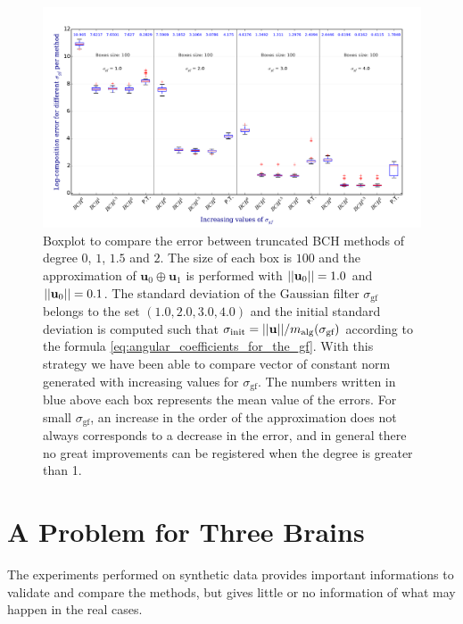 \begin{figure}[!ht]
	\hspace{-0.5cm}
	\includegraphics[scale=0.5]{figures/SVF_boxplot_comparisons_BCH.pdf}
	\caption{Boxplot to compare the error between truncated BCH methods of degree $0$, $1$, $1.5$ and $2$. The size of each box is $100$ and the approximation of $\mathbf{u}_{0}\oplus \mathbf{u}_1$ is performed with $\vert\lvert \mathbf{u}_{0} \rvert\vert = 1.0$ and $\vert\lvert \mathbf{u}_{0} \rvert\vert = 0.1$. The standard deviation of the Gaussian filter $\sigma_{\text{gf}}$ belongs to the set $(1.0, 2.0, 3.0, 4.0)$ and the initial standard deviation is computed such that $\sigma_{\text{init}} = \vert\lvert \mathbf{u} \rvert\vert/m_{\text{alg}}(\sigma_{\text{gf}})$ according to the formula \ref{eq:angular_coefficients_for_the_gf}. With this strategy we have been able to compare vector of constant norm generated with increasing values for $\sigma_{\text{gf}}$. The numbers written in blue above each box represents the mean value of the errors. For small $\sigma_{\text{gf}}$, an increase in the order of the approximation does not always corresponds to a decrease in the error, and in general there no great improvements can be registered when the degree is greater than 1. }
	\label{fig:SVF_boxplot_comparisons_BCH}
\end{figure}


\newpage

\section{A Problem for Three Brains} %
The experiments performed on synthetic data provides important informations to validate and compare the methods, but gives little or no information of what may happen in the real cases. 

